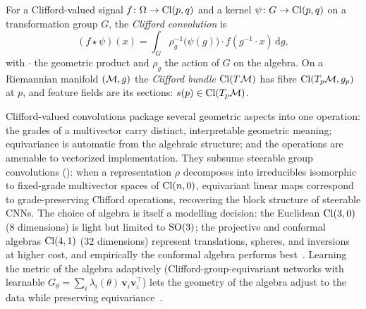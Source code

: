 \begin{definition}
\label{def:gauge:clifford-conv}
For a Clifford-valued signal $f\colon \Omega \to \operatorname{Cl}(p,q)$ and a kernel
$\psi\colon G \to \operatorname{Cl}(p,q)$ on a transformation group $G$, the \emph{Clifford
convolution} is
\[
  (f \star \psi)(x) = \int_G \rho_g^{-1}\big(\psi(g)\big)\cdot f(g^{-1}\cdot x)\,
  \mathrm{d}g,
\]
with $\cdot$ the geometric product and $\rho_g$ the action of $G$ on the algebra.
On a Riemannian manifold $(\mathcal{M}, g)$ the \emph{Clifford bundle} $\operatorname{Cl}(T\mathcal{M})$ has
fibre $\operatorname{Cl}(T_p\mathcal{M}, g_p)$ at $p$, and feature fields are its sections: $s(p) \in
\operatorname{Cl}(T_p\mathcal{M})$.
\end{definition}

Clifford-valued convolutions package several geometric aspects into one operation:
the grades of a multivector carry distinct, interpretable geometric meaning;
equivariance is automatic from the algebraic structure; and the operations are
amenable to vectorized implementation. They subsume steerable group convolutions
(): when a representation $\rho$ decomposes into irreducibles
isomorphic to fixed-grade multivector spaces of $\operatorname{Cl}(n,0)$, equivariant linear
maps correspond to grade-preserving Clifford operations, recovering the block
structure of steerable CNNs. The choice of algebra is itself a modelling
decision: the Euclidean $\operatorname{Cl}(3,0)$ ($8$ dimensions) is light but limited to
$\operatorname{SO}(3)$; the projective and conformal algebras $\operatorname{Cl}(4,1)$ ($32$ dimensions)
represent translations, spheres, and inversions at higher cost, and empirically
the conformal algebra performs best~\citep{dehaan2024euclidean}. Learning the
metric of the algebra adaptively (Clifford-group-equivariant networks with
learnable $G_\theta = \sum_i \lambda_i(\theta)\,\mathbf{v}_i\mathbf{v}_i^{\!\top}$)
lets the geometry of the algebra adjust to the data while preserving
equivariance~\citep{ali2024metric}.

